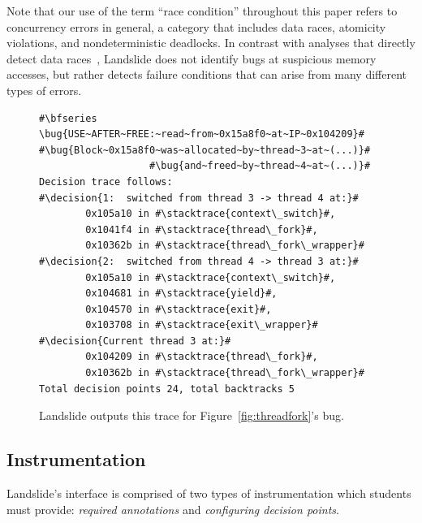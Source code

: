 Note that our use of the term ``race condition'' throughout this paper refers to concurrency errors in general, a category that includes data races, atomicity violations, and nondeterministic deadlocks.
In contrast with analyses that directly detect data races~\cite{tsan}, Landslide does not identify bugs at suspicious memory accesses, but rather detects failure conditions that can arise from many different types of errors.

\newcommand\bug[1]{\hilight{red}{#1}}
\newcommand\decision[1]{\bfseries \hilight{olivegreen}{#1}}
\newcommand\stacktrace[1]{\hilight{darkcyan}{#1}}
\begin{figure}[t]
\small
\begin{lstlisting}
#\bfseries \bug{USE~AFTER~FREE:~read~from~0x15a8f0~at~IP~0x104209}#
#\bug{Block~0x15a8f0~was~allocated~by~thread~3~at~(...)}#
                   #\bug{and~freed~by~thread~4~at~(...)}#
Decision trace follows:
#\decision{1:  switched from thread 3 -> thread 4 at:}#
        0x105a10 in #\stacktrace{context\_switch}#,
        0x1041f4 in #\stacktrace{thread\_fork}#,
        0x10362b in #\stacktrace{thread\_fork\_wrapper}#
#\decision{2:  switched from thread 4 -> thread 3 at:}#
        0x105a10 in #\stacktrace{context\_switch}#,
        0x104681 in #\stacktrace{yield}#,
        0x104570 in #\stacktrace{exit}#,
        0x103708 in #\stacktrace{exit\_wrapper}#
#\decision{Current thread 3 at:}#
        0x104209 in #\stacktrace{thread\_fork}#,
        0x10362b in #\stacktrace{thread\_fork\_wrapper}#
Total decision points 24, total backtracks 5
\end{lstlisting}
\caption{Landslide outputs this trace for Figure~\ref{fig:threadfork}'s bug.}
\label{fig:trace}
\end{figure}

\subsection{Instrumentation}
\label{sec:instrument}

Landslide's interface is comprised of two types of instrumentation which students must provide: {\em required annotations} and {\em configuring decision points}.

